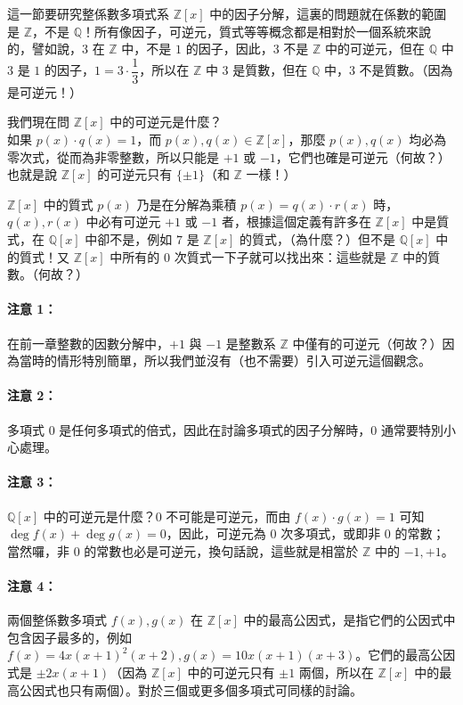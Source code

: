 這一節要研究整係數多項式系 $\mathbb{Z}[x]$ 中的因子分解，這裏的問題就在係數的範圍是 $\mathbb{Z}$，不是 $\mathbb{Q}$！所有像因子，可逆元，質式等等概念都是相對於一個系統來說的，譬如說，$3$ 在 $\mathbb{Z}$ 中，不是 $1$ 的因子，因此，$3$ 不是 $\mathbb{Z}$ 中的可逆元，但在 $\mathbb{Q}$ 中 $3$ 是 $1$ 的因子，$1 = 3 \cdot \dfrac{1}{3}$，所以在 $\mathbb{Z}$ 中 $3$ 是質數，但在 $\mathbb{Q}$ 中，$3$ 不是質數。（因為是可逆元！）

我們現在問 $\mathbb{Z}[x]$ 中的可逆元是什麼？\\
如果 $p(x) \cdot q(x) = 1$，而 $p(x), q(x) \in \mathbb{Z}[x]$，那麼 $p(x), q(x)$ 均必為零次式，從而為非零整數，所以只能是 $+1$ 或 $-1$，它們也確是可逆元（何故？）也就是說 $\mathbb{Z}[x]$ 的可逆元只有 $\{\pm 1\}$（和 $\mathbb{Z}$ 一樣！）

$\mathbb{Z}[x]$ 中的質式 $p(x)$ 乃是在分解為乘積 $p(x) = q(x) \cdot r(x)$ 時，$q(x), r(x)$ 中必有可逆元 $+1$ 或 $-1$ 者，根據這個定義有許多在 $\mathbb{Z}[x]$ 中是質式，在 $\mathbb{Q}[x]$ 中卻不是，例如 $7$ 是 $\mathbb{Z}[x]$ 的質式，（為什麼？）但不是 $\mathbb{Q}[x]$ 中的質式！又 $\mathbb{Z}[x]$ 中所有的 $0$ 次質式一下子就可以找出來：這些就是 $\mathbb{Z}$ 中的質數。（何故？）

\paragraph{注意 1：}
在前一章整數的因數分解中，$+1$ 與 $-1$ 是整數系 $\mathbb{Z}$ 中僅有的可逆元（何故？）因為當時的情形特別簡單，所以我們並沒有（也不需要）引入可逆元這個觀念。

\paragraph{注意 2：}
多項式 $0$ 是任何多項式的倍式，因此在討論多項式的因子分解時，$0$ 通常要特別小心處理。

\paragraph{注意 3：}
$\mathbb{Q}[x]$ 中的可逆元是什麼？$0$ 不可能是可逆元，而由 $f(x) \cdot g(x) = 1$ 可知 $\deg f(x) + \deg g(x) = 0$，因此，可逆元為 $0$ 次多項式，或即非 $0$ 的常數；當然囉，非 $0$ 的常數也必是可逆元，換句話說，這些就是相當於 $\mathbb{Z}$ 中的 $-1, +1$。

\paragraph{注意 4：}
兩個整係數多項式 $f(x), g(x)$ 在 $\mathbb{Z}[x]$ 中的最高公因式，是指它們的公因式中包含因子最多的，例如 $f(x) = 4x(x+1)^2(x+2), g(x) = 10x(x+1)(x+3)$。它們的最高公因式是 $\pm 2x(x+1)$（因為 $\mathbb{Z}[x]$ 中的可逆元只有 $\pm 1$ 兩個，所以在 $\mathbb{Z}[x]$ 中的最高公因式也只有兩個）。對於三個或更多個多項式可同樣的討論。

